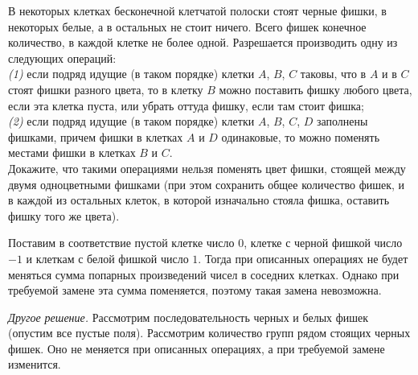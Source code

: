 В некоторых клетках бесконечной клетчатой полоски стоят черные фишки, в
некоторых белые, а в остальных не стоит ничего.
Всего фишек конечное количество, в каждой клетке не более одной.
Разрешается производить одну из следующих операций:
\\\emph{(1)}
если подряд идущие (в таком порядке) клетки $A$, $B$, $C$ таковы, что в $A$ и в
$C$ стоят фишки разного цвета, то в клетку $B$ можно поставить фишку любого
цвета, если эта клетка пуста, или убрать оттуда фишку, если там стоит фишка;
\\\emph{(2)}
если подряд идущие (в таком порядке) клетки $A$, $B$, $C$, $D$ заполнены
фишками, причем фишки в клетках $A$ и $D$ одинаковые, то можно поменять местами
фишки в клетках $B$ и $C$.
\\Докажите, что такими операциями нельзя поменять цвет фишки, стоящей между
двумя одноцветными фишками
(при этом сохранить общее количество фишек, и в каждой из остальных клеток, в
которой изначально стояла фишка, оставить фишку того же цвета).

\solution
Поставим в соответствие пустой клетке число $0$, клетке с черной фишкой число
$-1$ и клеткам с белой фишкой число $1$.
Тогда при описанных операциях не будет меняться сумма попарных произведений
чисел в соседних клетках.
Однако при требуемой замене эта сумма поменяется, поэтому такая замена
невозможна.
\par
\emph{Другое решение.}
Рассмотрим последовательность черных и белых фишек (опустим все пустые поля).
Рассмотрим количество групп рядом стоящих черных фишек.
Оно не меняется при описанных операциях, а при требуемой замене изменится.

